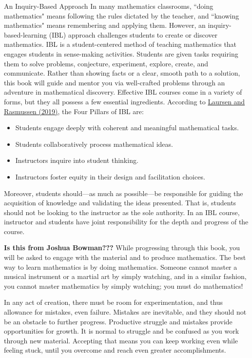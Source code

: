 \begin{section}{An Inquiry-Based Approach}
In many mathematics classrooms, ``doing mathematics" means following the rules dictated by the teacher, and ``knowing mathematics" means remembering and applying them. However, an inquiry-based-learning (IBL) approach challenges students to create or discover mathematics. IBL is a student-centered method of teaching mathematics that engages students in sense-making activities.  Students are given tasks requiring them to solve problems, conjecture, experiment, explore, create, and communicate.  Rather than showing facts or a clear, smooth path to a solution, this book will guide and mentor you via well-crafted problems through an adventure in mathematical discovery. Effective IBL courses come in a variety of forms, but they all possess a few essential ingredients. According to \href{https://www.colorado.edu/eer/sites/default/files/attached-files/laursenrasmussencommentaryauthorversion0219.pdf}{Laursen and Rasmussen (2019)}, the Four Pillars of IBL are:
\begin{itemize}
\item Students engage deeply with coherent and meaningful mathematical tasks.
\item Students collaboratively process mathematical ideas.
\item Instructors inquire into student thinking.
\item Instructors foster equity in their design and facilitation choices.
\end{itemize}

Moreover, students should---as much as possible---be responsible for guiding the acquisition of knowledge and validating the ideas presented. That is, students should not be looking to the instructor as the sole authority. In an IBL course, instructor and students have joint responsibility for the depth and progress of the course.

\textbf{Is this from Joshua Bowman???}
While progressing through this book, you will be asked to engage with the material and to produce mathematics. The best way to learn mathematics is by doing mathematics.  Someone cannot master a musical instrument or a martial art by simply watching, and in a similar fashion, you cannot master mathematics by simply watching; you must do mathematics!

In any act of creation, there must be room for experimentation, and thus allowance for mistakes, even failure. Mistakes are inevitable, and they should not be an obstacle to further progress. Productive struggle and mistakes provide opportunities for growth.  It is normal to struggle and be confused as you work through new material. Accepting that means you can keep working even while feeling stuck, until you overcome and reach even greater accomplishments.


\end{section}
